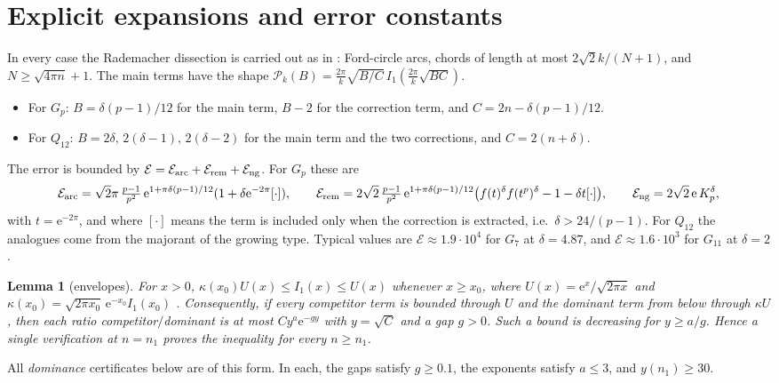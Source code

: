 \documentclass[11pt]{amsart}
\newtheorem{lemma}[theorem]{Lemma}
\theoremstyle{remark}
\newcommand{\cP}{\mathcal P}\newcommand{\cE}{\mathcal E}\newcommand{\e}{\mathrm e}
\begin{document}
\section{Explicit expansions and error constants}
In every case the Rademacher dissection is carried out as in \cite[\S4]{P1}: Ford-circle arcs, chords of length at most $2\sqrt2k/(N+1)$, and $N\ge\sqrt{4\pi n}+1$. The main terms have the shape $\cP_k(B)=\frac{2\pi}k\sqrt{B/C}\,I_1(\frac{2\pi}k\sqrt{BC})$.
\begin{itemize}[leftmargin=2em]
\item For $G_p$: $B=\delta(p-1)/12$ for the main term, $B-2$ for the correction term, and $C=2n-\delta(p-1)/12$.
\item For $Q_{12}$: $B=2\delta,\,2(\delta-1),\,2(\delta-2)$ for the main term and the two corrections, and $C=2(n+\delta)$.
\end{itemize}
The error is bounded by $\cE=\cE_{\rm arc}+\cE_{\rm rem}+\cE_{\rm ng}$. For $G_p$ these are
\[
\cE_{\rm arc}=\sqrt2\pi\,\tfrac{p-1}{p^2}\,\e^{1+\pi\delta(p-1)/12}(1+\delta\e^{-2\pi}[\cdot]),\qquad
\cE_{\rm rem}=2\sqrt2\,\tfrac{p-1}{p^2}\,\e^{1+\pi\delta(p-1)/12}\big(f(t)^\delta f(t^p)^\delta-1-\delta t[\cdot]\big),\qquad
\cE_{\rm ng}=2\sqrt2\,\e\,K_p^\delta,
\]
with $t=\e^{-2\pi}$, and where $[\cdot]$ means the term is included only when the correction is extracted, i.e.\ $\delta>24/(p-1)$. For $Q_{12}$ the analogues come from the majorant of the growing type. Typical values are $\cE\approx1.9\cdot10^4$ for $G_7$ at $\delta=4.87$, and $\cE\approx1.6\cdot10^3$ for $G_{11}$ at $\delta=2$.

\begin{lemma}[envelopes]\label{lem:env}
For $x>0$, $\kappa(x_0)U(x)\le I_1(x)\le U(x)$ whenever $x\ge x_0$, where $U(x)=\e^x/\sqrt{2\pi x}$ and $\kappa(x_0)=\sqrt{2\pi x_0}\,\e^{-x_0}I_1(x_0)$ \cite[Lemma 5.2]{P1}. Consequently, if every competitor term is bounded through $U$ and the dominant term from below through $\kappa U$, then each ratio competitor$/$dominant is at most $Cy^a\e^{-gy}$ with $y=\sqrt C$ and a gap $g>0$. Such a bound is decreasing for $y\ge a/g$. Hence a single verification at $n=n_1$ proves the inequality for every $n\ge n_1$.
\end{lemma}
All \emph{dominance} certificates below are of this form. In each, the gaps satisfy $g\ge0.1$, the exponents satisfy $a\le3$, and $y(n_1)\ge30$.
\end{document}

